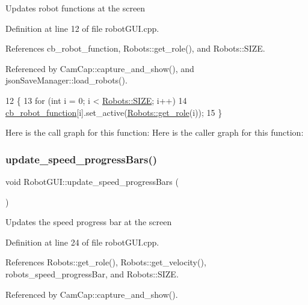 Updates robot functions at the screen 

Definition at line 12 of file robot\+G\+U\+I.\+cpp.



References cb\+\_\+robot\+\_\+function, Robots\+::get\+\_\+role(), and Robots\+::\+S\+I\+ZE.



Referenced by Cam\+Cap\+::capture\+\_\+and\+\_\+show(), and json\+Save\+Manager\+::load\+\_\+robots().


\begin{DoxyCode}
12                                       \{
13     \textcolor{keywordflow}{for} (\textcolor{keywordtype}{int} i = 0; i < \hyperlink{class_robots_ae9df2f1d345ad6740f0459956cdd4712}{Robots::SIZE}; i++)
14         \hyperlink{class_robot_g_u_i_ab1e977d6ae4bcf57e4306f017695eeeb}{cb\_robot\_function}[i].set\_active(\hyperlink{class_robots_ac5cdd16502bd325581fb2d732169a326}{Robots::get\_role}(i));
15 \}
\end{DoxyCode}
Here is the call graph for this function\+:
Here is the caller graph for this function\+:
\mbox{\label{class_robot_g_u_i_aeb4d6cd3764ae5d1d7a24a5565aa42cb}} 
\subsubsection{\texorpdfstring{update\+\_\+speed\+\_\+progress\+Bars()}{update\_speed\_progressBars()}}
{\footnotesize\ttfamily void Robot\+G\+U\+I\+::update\+\_\+speed\+\_\+progress\+Bars (\begin{DoxyParamCaption}{ }\end{DoxyParamCaption})}

Updates the speed progress bar at the screen 

Definition at line 24 of file robot\+G\+U\+I.\+cpp.



References Robots\+::get\+\_\+role(), Robots\+::get\+\_\+velocity(), robots\+\_\+speed\+\_\+progress\+Bar, and Robots\+::\+S\+I\+ZE.



Referenced by Cam\+Cap\+::capture\+\_\+and\+\_\+show().


